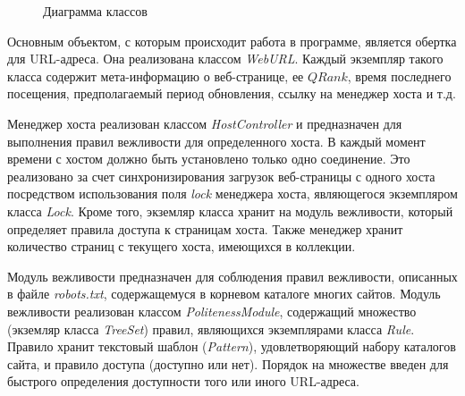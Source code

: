 \begin{figure}[h!]
\caption{Диаграмма классов}
\label{uml}
\end{figure}

Основным объектом, с которым происходит работа в программе, является обертка для URL-адреса. Она реализована классом \textit{WebURL}. Каждый экземпляр такого класса содержит мета-информацию о веб-странице, ее $QRank$, время последнего посещения, предполагаемый период обновления, ссылку на менеджер хоста и т.д.

Менеджер хоста  реализован классом \textit{HostController} и предназначен для выполнения правил вежливости для определенного хоста. В каждый момент времени с хостом должно быть установлено только одно соединение. Это реализовано за счет синхронизирования загрузок веб-страницы с одного хоста посредством использования поля \textit{lock} менеджера хоста, являющегося экземпляром класса \textit{Lock}. Кроме того, экземляр класса хранит на модуль вежливости, который определяет правила доступа к страницам хоста. Также менеджер хранит количество страниц с текущего хоста, имеющихся в коллекции.

Модуль вежливости предназначен для соблюдения правил вежливости, описанных в файле \textit{robots.txt}, содержащемуся в корневом каталоге многих сайтов. Модуль вежливости реализован классом \textit{PolitenessModule}, содержащий множество (экземляр класса \textit{TreeSet}) правил, являющихся экземплярами класса \textit{Rule}. Правило хранит текстовый шаблон (\textit{Pattern}), удовлетворяющий набору каталогов сайта, и правило доступа (доступно или нет). Порядок на множестве введен для быстрого определения доступности того или иного URL-адреса.

